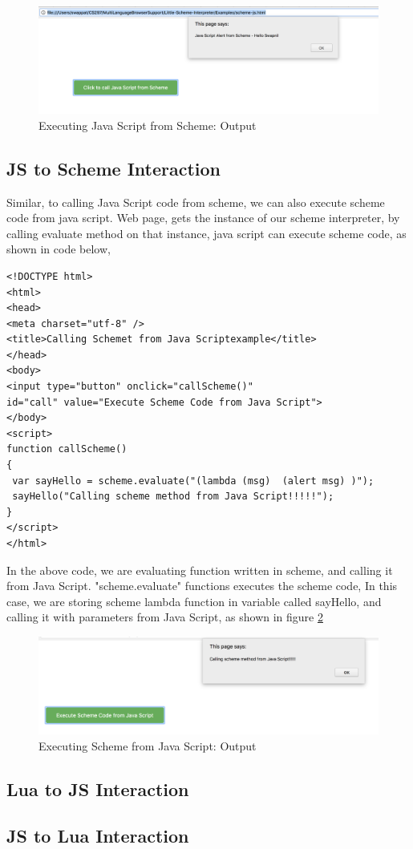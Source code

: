 \begin{figure}[H]
	\begin{center}
		\includegraphics[width=\linewidth]{./images/scheme-js-interaction.png}
	\end{center}
	\caption{Executing Java Script from Scheme: Output}
	\label{fig:scheme-js-interaction}
\end{figure}


\subsection{JS to Scheme Interaction}

Similar, to calling Java Script code from scheme, we can also execute scheme code from java script. Web page, gets the instance of our scheme interpreter, by calling evaluate method on that instance, java script can execute scheme code, as shown in code below, 

\begin{lstlisting}[frame=single]
<!DOCTYPE html>
<html>
<head>
<meta charset="utf-8" />
<title>Calling Schemet from Java Scriptexample</title>
</head>
<body>
<input type="button" onclick="callScheme()" 
id="call" value="Execute Scheme Code from Java Script">
</body>
<script>
function callScheme()
{
 var sayHello = scheme.evaluate("(lambda (msg)  (alert msg) )");
 sayHello("Calling scheme method from Java Script!!!!!");
}
</script>
</html>
\end{lstlisting}

In the above code, we are evaluating function written in scheme, and calling it from Java Script. "scheme.evaluate" functions executes the scheme code, In this case, we are storing scheme lambda function in variable called sayHello, and calling it with parameters from Java Script, as shown in figure \ref{fig:js-scheme-interaction}

\begin{figure}[H]
	\begin{center}
		\includegraphics[width=\linewidth]{./images/js-scheme-interaction.png}
	\end{center}
	\caption{Executing Scheme from Java Script: Output}
	\label{fig:js-scheme-interaction}
\end{figure}


\subsection{Lua to JS Interaction}




\subsection{JS to Lua Interaction}
